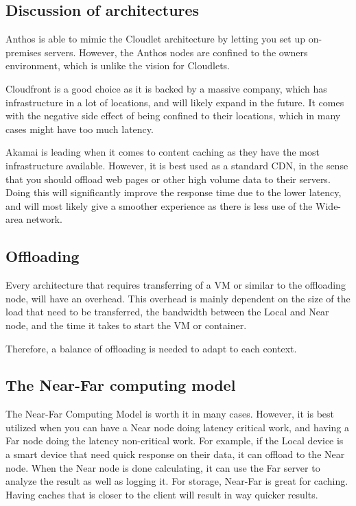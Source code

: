 \subsection{Discussion of architectures}
Anthos is able to mimic the Cloudlet architecture by letting you set up on-premises servers. However, the Anthos nodes are confined to the owners environment, which is unlike the vision for Cloudlets. 

Cloudfront is a good choice as it is backed by a massive company, which has infrastructure in a lot of locations, and will likely expand in the future. It comes with the negative side effect of being confined to their locations, which in many cases might have too much latency.

Akamai is leading when it comes to content caching as they have the most infrastructure available. However, it is best used as a standard CDN, in the sense that you should offload web pages or other high volume data to their servers. Doing this will significantly improve the response time due to the lower latency, and will most likely give a smoother experience as there is less use of the Wide-area network.


\subsection{Offloading}
Every architecture that requires transferring of a VM or similar to the offloading node, will have an overhead. This overhead is mainly dependent on the size of the load that need to be transferred, the bandwidth between the Local and Near node, and the time it takes to start the VM or container.


Therefore, a balance of offloading is needed to adapt to each context.






\subsection{The Near-Far computing model}
The Near-Far Computing Model is worth it in many cases. However, it is best utilized when you can have a Near node doing latency critical work, and having a Far node doing the latency non-critical work. For example, if the Local device is a smart device that need quick response on their data, it can offload to the Near node. When the Near node is done calculating, it can use the Far server to analyze the result as well as logging it. For storage, Near-Far is great for caching. Having caches that is closer to the client will result in way quicker results.

